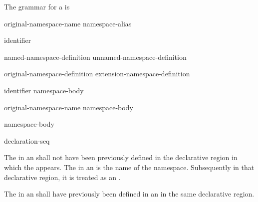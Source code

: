 \pnum
The grammar for a
is

\begin{bnf}
\br
        original-namespace-name\br
        namespace-alias
\end{bnf}

\begin{bnf}
\br
        identifier
\end{bnf}

\begin{bnf}
\br
        named-namespace-definition\br
        unnamed-namespace-definition
\end{bnf}

\begin{bnf}
\br
        original-namespace-definition\br
        extension-namespace-definition
\end{bnf}

\begin{bnf}
\br
         identifier \terminal{\{} namespace-body \terminal{\}}
\end{bnf}

\begin{bnf}
\br
         original-namespace-name \terminal{\{} namespace-body \terminal{\}}
\end{bnf}

\begin{bnf}
\br
         namespace-body \terminal{\}}
\end{bnf}

\begin{bnf}
\br
        declaration-seq\opt
\end{bnf}

\pnum
The  in an 
shall not have been previously defined in the declarative region in
which the  appears. The
 in an  is
the name of the namespace. Subsequently in that declarative region, it
is treated as an .

\pnum
The  in an
 shall have previously been
defined in an  in the same
declarative region.

